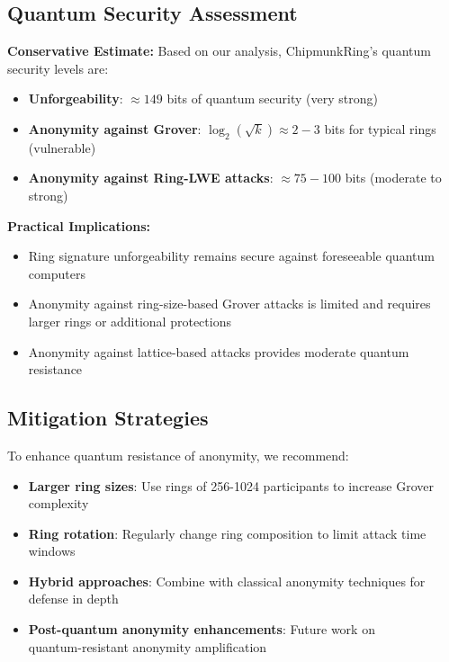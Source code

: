 \documentclass[11pt,a4paper]{article}
\begin{document}
\subsection{Quantum Security Assessment}

\textbf{Conservative Estimate:} Based on our analysis, ChipmunkRing's quantum security levels are:

\begin{itemize}
\item \textbf{Unforgeability}: $\approx 149$ bits of quantum security (very strong)
\item \textbf{Anonymity against Grover}: $\log_2(\sqrt{k}) \approx 2-3$ bits for typical rings (vulnerable)
\item \textbf{Anonymity against Ring-LWE attacks}: $\approx 75-100$ bits (moderate to strong)
\end{itemize}

\textbf{Practical Implications:}
\begin{itemize}
\item Ring signature unforgeability remains secure against foreseeable quantum computers
\item Anonymity against ring-size-based Grover attacks is limited and requires larger rings or additional protections
\item Anonymity against lattice-based attacks provides moderate quantum resistance
\end{itemize}

\subsection{Mitigation Strategies}

To enhance quantum resistance of anonymity, we recommend:

\begin{itemize}
\item \textbf{Larger ring sizes}: Use rings of 256-1024 participants to increase Grover complexity
\item \textbf{Ring rotation}: Regularly change ring composition to limit attack time windows
\item \textbf{Hybrid approaches}: Combine with classical anonymity techniques for defense in depth
\item \textbf{Post-quantum anonymity enhancements}: Future work on \\
quantum-resistant anonymity amplification
\end{itemize}
\end{document}

